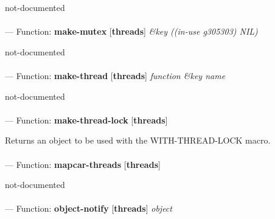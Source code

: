 \begin{adjustwidth}{5em}{5em}
not-documented
\end{adjustwidth}

\paragraph{}
\label{THREADS:MAKE-MUTEX}
--- Function: \textbf{make-mutex} [\textbf{threads}] \textit{\&key ((in-use g305303) NIL)}

\begin{adjustwidth}{5em}{5em}
not-documented
\end{adjustwidth}

\paragraph{}
\label{THREADS:MAKE-THREAD}
--- Function: \textbf{make-thread} [\textbf{threads}] \textit{function \&key name}

\begin{adjustwidth}{5em}{5em}
not-documented
\end{adjustwidth}

\paragraph{}
\label{THREADS:MAKE-THREAD-LOCK}
--- Function: \textbf{make-thread-lock} [\textbf{threads}] \textit{}

\begin{adjustwidth}{5em}{5em}
Returns an object to be used with the WITH-THREAD-LOCK macro.
\end{adjustwidth}

\paragraph{}
\label{THREADS:MAPCAR-THREADS}
--- Function: \textbf{mapcar-threads} [\textbf{threads}] \textit{}

\begin{adjustwidth}{5em}{5em}
not-documented
\end{adjustwidth}

\paragraph{}
\label{THREADS:OBJECT-NOTIFY}
--- Function: \textbf{object-notify} [\textbf{threads}] \textit{object}

